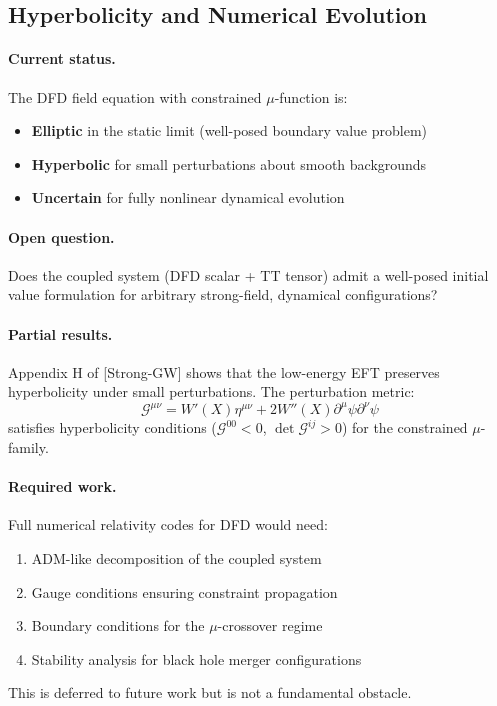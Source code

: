 \subsection{Hyperbolicity and Numerical Evolution}\label{sec:open-hyperbolicity}

\paragraph{Current status.}
The DFD field equation with constrained $\mu$-function is:
\begin{itemize}
\item \textbf{Elliptic} in the static limit (well-posed boundary value problem)
\item \textbf{Hyperbolic} for small perturbations about smooth backgrounds
\item \textbf{Uncertain} for fully nonlinear dynamical evolution
\end{itemize}

\paragraph{Open question.}
Does the coupled system (DFD scalar + TT tensor) admit a well-posed initial value formulation for arbitrary strong-field, dynamical configurations?

\paragraph{Partial results.}
Appendix H of [Strong-GW] shows that the low-energy EFT preserves hyperbolicity under small perturbations. The perturbation metric:
\begin{equation}
\mathcal{G}^{\mu\nu} = W'(X)\eta^{\mu\nu} + 2W''(X)\partial^\mu\psi\partial^\nu\psi
\end{equation}
satisfies hyperbolicity conditions ($\mathcal{G}^{00} < 0$, $\det \mathcal{G}^{ij} > 0$) for the constrained $\mu$-family.

\paragraph{Required work.}
Full numerical relativity codes for DFD would need:
\begin{enumerate}
\item ADM-like decomposition of the coupled system
\item Gauge conditions ensuring constraint propagation
\item Boundary conditions for the $\mu$-crossover regime
\item Stability analysis for black hole merger configurations
\end{enumerate}
This is deferred to future work but is not a fundamental obstacle.

